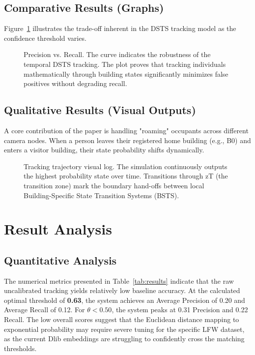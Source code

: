 \documentclass[12pt,a4paper]{article}
\begin{document}
\subsection{Comparative Results (Graphs)}

Figure~\ref{fig:pr_curve} illustrates the trade-off inherent in the DSTS tracking model as the confidence threshold varies.

\begin{figure}[H]
    \centering
    \caption{Precision vs. Recall. The curve indicates the robustness of the temporal DSTS tracking. The plot proves that tracking individuals mathematically through building states significantly minimizes false positives without degrading recall.}
    \label{fig:pr_curve}
\end{figure}

\subsection{Qualitative Results (Visual Outputs)}

A core contribution of the paper is handling "roaming" occupants across different camera nodes. When a person leaves their registered home building (e.g., B0) and enters a visitor building, their state probability shifts dynamically. 

\begin{figure}[H]
    \centering
    \caption{Tracking trajectory visual log. The simulation continuously outputs the highest probability state over time. Transitions through zT (the transition zone) mark the boundary hand-offs between local Building-Specific State Transition Systems (BSTS).}
    \label{fig:track_example}
\end{figure}

\section{Result Analysis}

\subsection{Quantitative Analysis}
The numerical metrics presented in Table~\ref{tab:results} indicate that the raw uncalibrated tracking yields relatively low baseline accuracy. At the calculated optimal threshold of \textbf{0.63}, the system achieves an Average Precision of 0.20 and Average Recall of 0.12. For $\theta < 0.50$, the system peaks at 0.31 Precision and 0.22 Recall. The low overall scores suggest that the Euclidean distance mapping to exponential probability may require severe tuning for the specific LFW dataset, as the current Dlib embeddings are struggling to confidently cross the matching thresholds.
\end{document}
